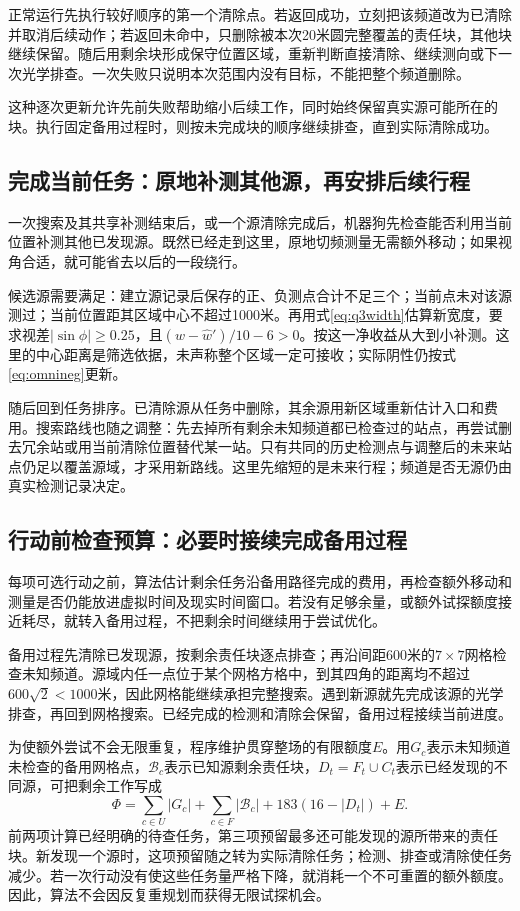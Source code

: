 \documentclass[UTF8,a4paper,12pt,fontset=fandol]{ctexart}
\newcommand{\nextpage}{\clearpage}
\begin{document}
正常运行先执行较好顺序的第一个清除点。若返回成功，立刻把该频道改为已清除并取消后续动作；若返回未命中，只删除被本次20米圆完整覆盖的责任块，其他块继续保留。随后用剩余块形成保守位置区域，重新判断直接清除、继续测向或下一次光学排查。一次失败只说明本次范围内没有目标，不能把整个频道删除。

这种逐次更新允许先前失败帮助缩小后续工作，同时始终保留真实源可能所在的块。执行固定备用过程时，则按未完成块的顺序继续排查，直到实际清除成功。

\subsection{完成当前任务：原地补测其他源，再安排后续行程}
一次搜索及其共享补测结束后，或一个源清除完成后，机器狗先检查能否利用当前位置补测其他已发现源。既然已经走到这里，原地切频测量无需额外移动；如果视角合适，就可能省去以后的一段绕行。

候选源需要满足：建立源记录后保存的正、负测点合计不足三个；当前点未对该源测过；当前位置距其区域中心不超过1000米。再用式\eqref{eq:q3width}估算新宽度，要求视差$|\sin\phi|\ge0.25$，且$(w-\widehat w')/10-6>0$。按这一净收益从大到小补测。这里的中心距离是筛选依据，未声称整个区域一定可接收；实际阴性仍按式\eqref{eq:omnineg}更新。

随后回到任务排序。已清除源从任务中删除，其余源用新区域重新估计入口和费用。搜索路线也随之调整：先去掉所有剩余未知频道都已检查过的站点，再尝试删去冗余站或用当前清除位置替代某一站。只有共同的历史检测点与调整后的未来站点仍足以覆盖源域，才采用新路线。这里先缩短的是未来行程；频道是否无源仍由真实检测记录决定。

\nextpage
\subsection{行动前检查预算：必要时接续完成备用过程}
每项可选行动之前，算法估计剩余任务沿备用路径完成的费用，再检查额外移动和测量是否仍能放进虚拟时间及现实时间窗口。若没有足够余量，或额外试探额度接近耗尽，就转入备用过程，不把剩余时间继续用于尝试优化。

备用过程先清除已发现源，按剩余责任块逐点排查；再沿间距600米的$7\times7$网格检查未知频道。源域内任一点位于某个网格方格中，到其四角的距离均不超过$600\sqrt2<1000$米，因此网格能继续承担完整搜索。遇到新源就先完成该源的光学排查，再回到网格搜索。已经完成的检测和清除会保留，备用过程接续当前进度。

为使额外尝试不会无限重复，程序维护贯穿整场的有限额度$E$。用$G_c$表示未知频道未检查的备用网格点，$\mathcal B_c$表示已知源剩余责任块，$D_t=F_t\cup C_t$表示已经发现的不同源，可把剩余工作写成
\begin{equation}\label{eq:rank}
\Phi=\sum_{c\in U}|G_c|+\sum_{c\in F}|\mathcal B_c|+183(16-|D_t|)+E.
\end{equation}
前两项计算已经明确的待查任务，第三项预留最多还可能发现的源所带来的责任块。新发现一个源时，这项预留随之转为实际清除任务；检测、排查或清除使任务减少。若一次行动没有使这些任务量严格下降，就消耗一个不可重置的额外额度。因此，算法不会因反复重规划而获得无限试探机会。
\end{document}
